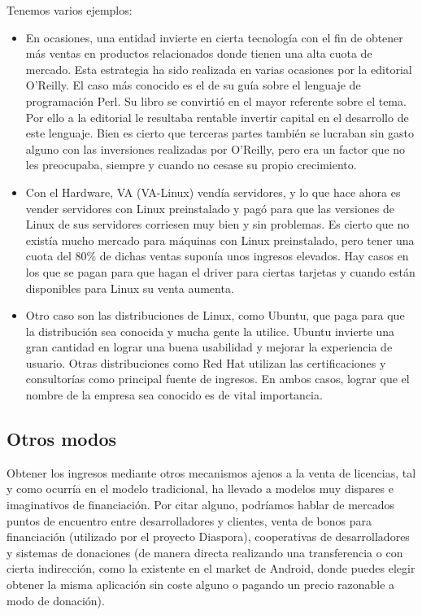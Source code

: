 Tenemos varios ejemplos:
\begin{itemize}
  \item En ocasiones, una entidad invierte en cierta tecnología con el
    fin de obtener más ventas en productos relacionados donde tienen
    una alta cuota de mercado. Esta estrategia ha sido realizada en
    varias ocasiones por la editorial O'Reilly. El caso más conocido
    es el de su guía sobre el lenguaje de programación Perl. Su libro
    se convirtió en el mayor referente sobre el tema. Por ello
    a la editorial le resultaba rentable invertir capital en el
    desarrollo de este lenguaje. Bien es cierto que terceras partes
    también se lucraban sin gasto alguno con las inversiones
    realizadas por O'Reilly, pero era un factor que no les preocupaba,
    siempre y cuando no cesase su propio crecimiento.
  \item Con el Hardware, VA (VA-Linux) vendía servidores, y lo que hace ahora es vender
servidores con Linux preinstalado y pagó para que las versiones de Linux
de sus servidores corriesen muy bien y sin problemas. 
Es cierto que no existía mucho mercado para máquinas con Linux
preinstalado, pero tener una cuota del 80\% de dichas ventas suponía
unos ingresos elevados.
Hay casos en los que se
pagan para que hagan el driver para ciertas tarjetas y cuando están disponibles
para Linux su venta aumenta.
\item Otro caso son las distribuciones de Linux, como Ubuntu, que paga para
que la distribución sea conocida y mucha gente la utilice.
Ubuntu invierte una gran cantidad en lograr una buena usabilidad y
mejorar la experiencia de usuario. Otras distribuciones como Red Hat
utilizan las certificaciones y consultorías como principal fuente de
ingresos. En ambos casos, lograr que el nombre de la empresa sea
conocido es de vital importancia.
\end{itemize}

\subsection{Otros modos}
Obtener los ingresos mediante otros mecanismos ajenos a la venta de
licencias, tal y como ocurría en el modelo tradicional, ha llevado a
modelos muy dispares e imaginativos de financiación. Por citar alguno,
podríamos hablar de mercados puntos de encuentro entre desarrolladores
y clientes, venta de bonos para financiación (utilizado por el
proyecto Diaspora), cooperativas de desarrolladores y sistemas de
donaciones (de manera directa realizando una transferencia o con
cierta indirección, como la existente en el market de Android, donde
puedes elegir obtener la misma aplicación sin coste alguno o
pagando un precio razonable a modo de donación).

